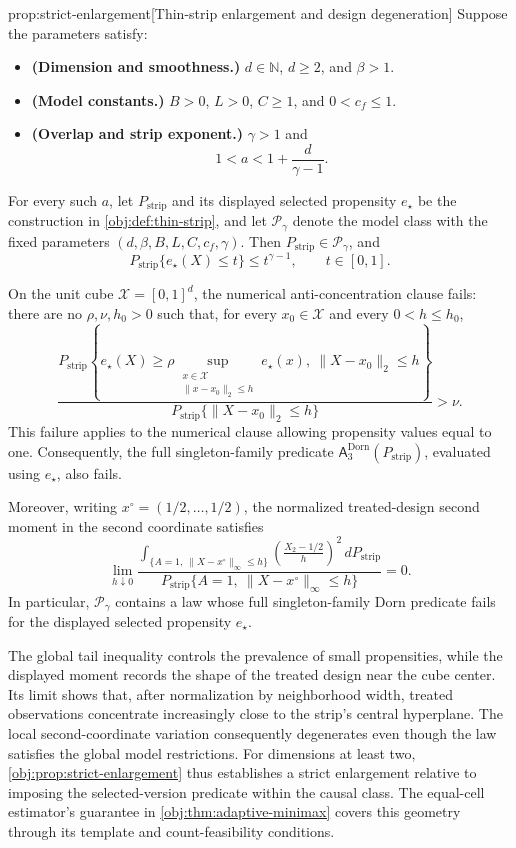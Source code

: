 \documentclass[11pt]{article}
\begin{document}
\begin{propositionv}{prop:strict-enlargement}[Thin-strip enlargement and design degeneration]
Suppose the parameters satisfy:
\begin{itemize}
\item \textbf{(Dimension and smoothness.)} \(d\in\mathbb N\), \(d\ge2\), and \(\beta>1\).
\item \textbf{(Model constants.)} \(B>0\), \(L>0\), \(C\ge1\), and \(0<c_f\le1\).
\item \textbf{(Overlap and strip exponent.)} \(\gamma>1\) and
\[
1<a<1+\frac{d}{\gamma-1}.
\]
\end{itemize}
For every such \(a\), let \(P_{\mathrm{strip}}\) and its displayed selected propensity \(e_\star\) be the construction in \cref{obj:def:thin-strip}, and let \(\mathcal P_\gamma\) denote the model class with the fixed parameters \((d,\beta,B,L,C,c_f,\gamma)\). Then \(P_{\mathrm{strip}}\in\mathcal P_\gamma\), and
\[
P_{\mathrm{strip}}\{e_\star(X)\le t\}\le t^{\gamma-1},
\qquad t\in[0,1].
\]

On the unit cube \(\mathcal X=[0,1]^d\), the numerical anti-concentration clause fails: there are no \(\rho,\nu,h_0>0\) such that, for every \(x_0\in\mathcal X\) and every \(0<h\le h_0\),
\[
\frac{
P_{\mathrm{strip}}\!\left\{
e_\star(X)\ge
\rho\sup_{\substack{x\in\mathcal X\\ \|x-x_0\|_2\le h}}e_\star(x),
\ \|X-x_0\|_2\le h
\right\}
}{
P_{\mathrm{strip}}\{\|X-x_0\|_2\le h\}
}
>\nu.
\]
This failure applies to the numerical clause allowing propensity values equal to one. Consequently, the full singleton-family predicate
\(\mathsf A_{3}^{\mathrm{Dorn}}(P_{\mathrm{strip}})\), evaluated using \(e_\star\), also fails.

Moreover, writing \(x^\circ=(1/2,\ldots,1/2)\), the normalized treated-design second moment in the second coordinate satisfies
\[
\lim_{h\downarrow0}
\frac{
\displaystyle
\int_{\{A=1,\ \|X-x^\circ\|_\infty\le h\}}
\left(\frac{X_2-1/2}{h}\right)^2
\,dP_{\mathrm{strip}}
}{
P_{\mathrm{strip}}\{A=1,\ \|X-x^\circ\|_\infty\le h\}
}
=0.
\]
In particular, \(\mathcal P_\gamma\) contains a law whose full singleton-family Dorn predicate fails for the displayed selected propensity \(e_\star\).
\end{propositionv}

The global tail inequality controls the prevalence of small propensities, while the displayed moment records the shape of the treated design near the cube center. Its limit shows that, after normalization by neighborhood width, treated observations concentrate increasingly close to the strip's central hyperplane. The local second-coordinate variation consequently degenerates even though the law satisfies the global model restrictions. For dimensions at least two, \cref{obj:prop:strict-enlargement} thus establishes a strict enlargement relative to imposing the selected-version predicate within the causal class. The equal-cell estimator's guarantee in \cref{obj:thm:adaptive-minimax} covers this geometry through its template and count-feasibility conditions.
\end{document}
